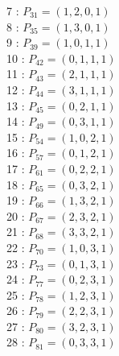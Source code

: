 \documentclass{article}
\begin{document}
{\begin{multicols}{3}
7 : $P_{31}=( 1, 2, 0, 1 )$\\
8 : $P_{35}=( 1, 3, 0, 1 )$\\
9 : $P_{39}=( 1, 0, 1, 1 )$\\
10 : $P_{42}=( 0, 1, 1, 1 )$\\
11 : $P_{43}=( 2, 1, 1, 1 )$\\
12 : $P_{44}=( 3, 1, 1, 1 )$\\
13 : $P_{45}=( 0, 2, 1, 1 )$\\
14 : $P_{49}=( 0, 3, 1, 1 )$\\
15 : $P_{54}=( 1, 0, 2, 1 )$\\
16 : $P_{57}=( 0, 1, 2, 1 )$\\
17 : $P_{61}=( 0, 2, 2, 1 )$\\
18 : $P_{65}=( 0, 3, 2, 1 )$\\
19 : $P_{66}=( 1, 3, 2, 1 )$\\
20 : $P_{67}=( 2, 3, 2, 1 )$\\
21 : $P_{68}=( 3, 3, 2, 1 )$\\
22 : $P_{70}=( 1, 0, 3, 1 )$\\
23 : $P_{73}=( 0, 1, 3, 1 )$\\
24 : $P_{77}=( 0, 2, 3, 1 )$\\
25 : $P_{78}=( 1, 2, 3, 1 )$\\
26 : $P_{79}=( 2, 2, 3, 1 )$\\
27 : $P_{80}=( 3, 2, 3, 1 )$\\
28 : $P_{81}=( 0, 3, 3, 1 )$\\
\end{multicols}


%


%


}%
\end{document}
